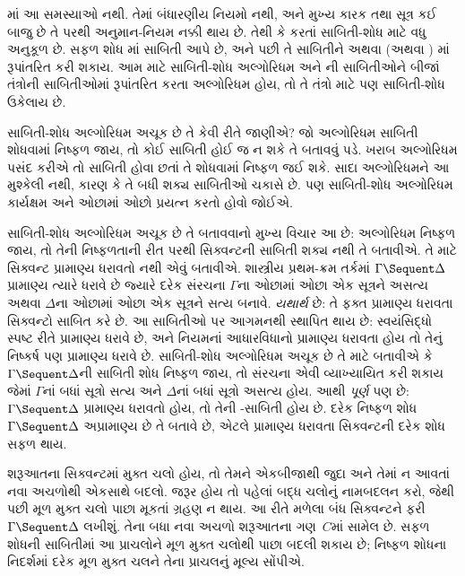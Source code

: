 માં
આ સમસ્યાઓ
નથી. તેમાં
બંધારણીય
નિયમો નથી,
અને મુખ્ય કારક
તથા સૂત્ર
કઈ બાજુ છે
તે પરથી
અનુમાન-નિયમ
નક્કી થાય
છે. તેથી
 કે
 કરતાં
સાબિતી-શોધ
માટે વધુ
અનુકૂળ છે.
સફળ શોધ
માં
સાબિતી
આપે છે,
અને પછી
તે સાબિતીને
અથવા
(અથવા
)
માં રૂપાંતરિત
કરી શકાય.
આમ 
માટે સાબિતી-શોધ
અલ્ગોરિધમ
અને
ની
સાબિતીઓને
બીજાં તંત્રોની
સાબિતીઓમાં
રૂપાંતરિત
કરતા અલ્ગોરિધમ
હોય, તો
તે તંત્રો
માટે પણ
સાબિતી-શોધ
ઉકેલાય છે.

સાબિતી-શોધ
અલ્ગોરિધમ
અચૂક છે
તે કેવી
રીતે જાણીએ?
જો અલ્ગોરિધમ
સાબિતી
શોધવામાં
નિષ્ફળ જાય,
તો કોઈ
સાબિતી
હોઈ જ
ન શકે
તે બતાવવું
પડે. ખરાબ
અલ્ગોરિધમ
પસંદ કરીએ
તો સાબિતી
હોવા છતાં
તે શોધવામાં
નિષ્ફળ જઈ
શકે. સાદા
અલ્ગોરિધમને
આ મુશ્કેલી
નથી, કારણ
કે તે
બધી શક્ય
સાબિતીઓ
ચકાસે છે.
પણ સાબિતી-શોધ
અલ્ગોરિધમ
કાર્યક્ષમ
અને ઓછામાં
ઓછો પ્રયત્ન
કરતો હોવો
જોઈએ.

સાબિતી-શોધ
અલ્ગોરિધમ
અચૂક છે
તે બતાવવાનો
મુખ્ય વિચાર
આ છે: અલ્ગોરિધમ
નિષ્ફળ જાય,
તો તેની
નિષ્ફળતાની
રીત પરથી
સિક્વન્ટની
સાબિતી
શક્ય નથી
તે બતાવીએ.
તે માટે
સિક્વન્ટ
પ્રામાણ્ય ધરાવતો નથી
એવું બતાવીએ.
શાસ્ત્રીય
પ્રથમ-ક્રમ
તર્કમાં
$\Gamma \Sequent \Delta$
પ્રામાણ્ય ત્યારે ધરાવે છે
જ્યારે
દરેક
સંરચના
$\Gamma$ના
ઓછામાં ઓછા
એક સૂત્રને
અસત્ય અથવા
$\Delta$ના
ઓછામાં ઓછા
એક સૂત્રને
સત્ય બનાવે.
\emph{યથાર્થ}
છે: તે ફક્ત
પ્રામાણ્ય ધરાવતા
સિક્વન્ટો
સાબિત
કરે છે.
આ સાબિતીઓ
પર આગમનથી
સ્થાપિત થાય
છે: સ્વયંસિદ્ધો
સ્પષ્ટ રીતે
પ્રામાણ્ય ધરાવે છે,
અને નિયમનાં
આધારવિધાનો
પ્રામાણ્ય ધરાવતા હોય
તો તેનું
નિષ્કર્ષ પણ
પ્રામાણ્ય ધરાવે છે.
સાબિતી-શોધ
અલ્ગોરિધમ
અચૂક છે
તે માટે
બતાવીએ કે
$\Gamma \Sequent \Delta$ની
સાબિતી
શોધ નિષ્ફળ
જાય, તો
સંરચના
એવી વ્યાખ્યાયિત
કરી શકાય
જેમાં
$\Gamma$નાં
બધાં
સૂત્રો
સત્ય અને
$\Delta$નાં
બધાં
સૂત્રો
અસત્ય હોય.
આથી
\emph{પૂર્ણ}
પણ છે:
$\Gamma \Sequent \Delta$
પ્રામાણ્ય ધરાવતો
હોય, તો
તેની
-સાબિતી
હોય છે.
દરેક નિષ્ફળ
શોધ
$\Gamma \Sequent \Delta$
અપ્રામાણ્ય
છે તે બતાવે
છે, એટલે
પ્રામાણ્ય ધરાવતા
સિક્વન્ટની
દરેક શોધ
સફળ થાય.
\endgroup

\begingroup
\makeatletter{}\makeatother


\label{guunit:OLP-0683}


શરૂઆતના સિક્વન્ટમાં મુક્ત ચલો હોય, તો
તેમને એકબીજાથી જુદા અને તેમાં ન આવતાં નવા
અચળોથી એકસાથે બદલો. જરૂર હોય તો પહેલાં
બદ્ધ ચલોનું નામબદલન કરો, જેથી પછી મૂળ મુક્ત ચલો
પાછા મૂકતાં ગ્રહણ ન થાય. આ રીતે મળેલા બંધ
સિક્વન્ટને ફરી $\Gamma\Sequent\Delta$ લખીશું.
તેના બધા નવા અચળો શરૂઆતના ગણ~$C$માં સામેલ છે.
સફળ શોધની સાબિતીમાં આ પ્રાચલોને મૂળ મુક્ત ચલોથી
પાછા બદલી શકાય છે; નિષ્ફળ શોધના નિદર્શમાં દરેક
મૂળ મુક્ત ચલને તેના પ્રાચલનું મૂલ્ય સોંપીએ.

